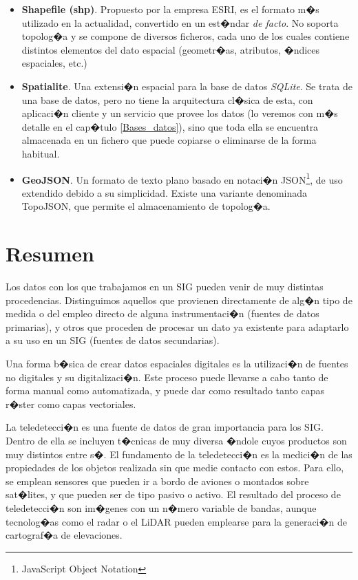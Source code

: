 \begin{itemize}
	\item \textbf{Shapefile (shp)}. Propuesto por la empresa ESRI, es el formato m�s utilizado en la actualidad, convertido en un est�ndar \emph{de facto}. No soporta topolog�a y se compone de diversos ficheros, cada uno de los cuales contiene distintos elementos del dato espacial (geometr�as, atributos, �ndices espaciales, etc.)
	\item \textbf{Spatialite}. Una extensi�n espacial para la base de datos \emph{SQLite}. Se trata de una base de datos, pero no tiene la arquitectura cl�sica de esta, con aplicaci�n cliente y un servicio que provee los datos (lo veremos con m�s detalle en el cap�tulo \ref{Bases_datos}), sino que toda ella se encuentra almacenada en un fichero que puede copiarse o eliminarse de la forma habitual.
	\item \textbf{GeoJSON}. Un formato de texto plano basado en notaci�n JSON\footnote{JavaScript Object Notation}, de uso extendido debido a su simplicidad. Existe una variante denominada TopoJSON, que permite el almacenamiento de topolog�a.
\end{itemize}

\section{Resumen}

Los datos con los que trabajamos en un SIG pueden venir de muy distintas procedencias. Distinguimos aquellos que provienen directamente de alg�n tipo de medida o del empleo directo de alguna instrumentaci�n (fuentes de datos primarias), y otros que proceden de procesar un dato ya existente para adaptarlo a su uso en un SIG (fuentes de datos secundarias).

Una forma b�sica de crear datos espaciales digitales es la utilizaci�n de fuentes no digitales y su digitalizaci�n. Este proceso puede llevarse a cabo tanto de forma manual como automatizada, y puede dar como resultado tanto capas r�ster como capas vectoriales.

La teledetecci�n es una fuente de datos de gran importancia para los SIG. Dentro de ella se incluyen t�cnicas de muy diversa �ndole cuyos productos son muy distintos entre s�. El fundamento de la teledetecci�n es la medici�n de las propiedades de los objetos realizada sin que medie contacto con estos. Para ello, se emplean sensores que pueden ir a bordo de aviones o montados sobre sat�lites, y que pueden ser de tipo pasivo o activo. El resultado del proceso de teledetecci�n son im�genes con un n�mero variable de bandas, aunque tecnolog�as como el radar o el LiDAR pueden emplearse para la generaci�n de cartograf�a de elevaciones.

